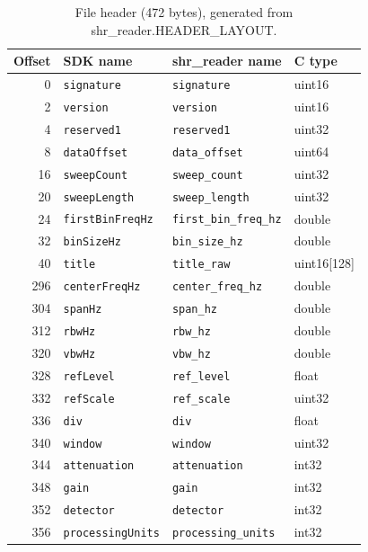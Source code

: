 \documentclass[11pt,a4paper]{article}
\begin{document}
\begin{longtable}{rp{3.4cm}p{4.2cm}l}
\caption{File header (472 bytes), generated from shr\_reader.HEADER\_LAYOUT.}\\
\toprule
\textbf{Offset} & \textbf{SDK name} & \textbf{shr\_reader name} & \textbf{C type}\\
\midrule
\endhead
0 & \texttt{signature} & \texttt{signature} & uint16\\
2 & \texttt{version} & \texttt{version} & uint16\\
4 & \texttt{reserved1} & \texttt{reserved1} & uint32\\
8 & \texttt{dataOffset} & \texttt{data\_\allowbreak{}offset} & uint64\\
16 & \texttt{sweepCount} & \texttt{sweep\_\allowbreak{}count} & uint32\\
20 & \texttt{sweepLength} & \texttt{sweep\_\allowbreak{}length} & uint32\\
24 & \texttt{firstBinFreqHz} & \texttt{first\_\allowbreak{}bin\_\allowbreak{}freq\_\allowbreak{}hz} & double\\
32 & \texttt{binSizeHz} & \texttt{bin\_\allowbreak{}size\_\allowbreak{}hz} & double\\
40 & \texttt{title} & \texttt{title\_\allowbreak{}raw} & uint16[128]\\
296 & \texttt{centerFreqHz} & \texttt{center\_\allowbreak{}freq\_\allowbreak{}hz} & double\\
304 & \texttt{spanHz} & \texttt{span\_\allowbreak{}hz} & double\\
312 & \texttt{rbwHz} & \texttt{rbw\_\allowbreak{}hz} & double\\
320 & \texttt{vbwHz} & \texttt{vbw\_\allowbreak{}hz} & double\\
328 & \texttt{refLevel} & \texttt{ref\_\allowbreak{}level} & float\\
332 & \texttt{refScale} & \texttt{ref\_\allowbreak{}scale} & uint32\\
336 & \texttt{div} & \texttt{div} & float\\
340 & \texttt{window} & \texttt{window} & uint32\\
344 & \texttt{attenuation} & \texttt{attenuation} & int32\\
348 & \texttt{gain} & \texttt{gain} & int32\\
352 & \texttt{detector} & \texttt{detector} & int32\\
356 & \texttt{processingUnits} & \texttt{processing\_\allowbreak{}units} & int32\\

\end{longtable}
\end{document}

